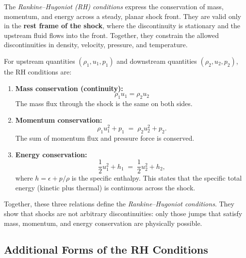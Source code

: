 \begin{definition}
The \emph{Rankine--Hugoniot (RH) conditions} express the conservation of mass, momentum, and energy across a steady, planar shock front.  
They are valid only in the \textbf{rest frame of the shock}, where the discontinuity is stationary and the upstream fluid flows into the front.  
Together, they constrain the allowed discontinuities in density, velocity, pressure, and temperature.

\medskip
For upstream quantities $(\rho_1, u_1, p_1)$ and downstream quantities $(\rho_2, u_2, p_2)$, the RH conditions are:

\begin{enumerate}
    \item \textbf{Mass conservation (continuity):}
\begin{equation}
    \label{eq:rh_continuity}
    \rho_1u_1 = \rho_2 u_2
\end{equation}
    The mass flux through the shock is the same on both sides.

    \item \textbf{Momentum conservation:}
    \begin{equation}
   \label{eq:rh_momentum}
                \rho_1 u_1^2 + p_1 \;=\; \rho_2 u_2^2 + p_2 .
    \end{equation}
    The sum of momentum flux and pressure force is conserved.

    \item \textbf{Energy conservation:}
    \begin{equation}
        \label{eq:rh_energy}
        \frac{1}{2}u_1^2 + h_1 \;=\; \frac{1}{2}u_2^2 + h_2 ,
    \end{equation}
    where $h = \epsilon + p/\rho$ is the specific enthalpy.  
    This states that the specific total energy (kinetic plus thermal) is continuous across the shock.
\end{enumerate}

\noindent
Together, these three relations define the \emph{Rankine--Hugoniot conditions}.  
They show that shocks are not arbitrary discontinuities: only those jumps that satisfy mass, momentum, and energy conservation are physically possible.
\end{definition}


\subsection{Additional Forms of the RH Conditions}

